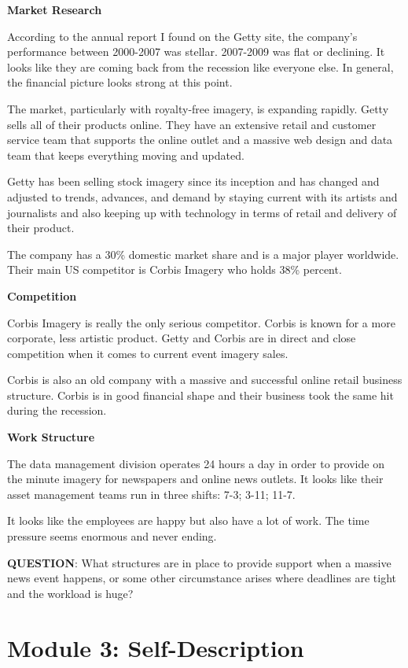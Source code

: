\textbf{Market Research}

According to the annual report I found on the Getty site, the company's performance between 2000-2007 was stellar. 2007-2009 was flat or declining. It looks like they are coming back from the recession like everyone else. In general, the financial picture looks strong at this point.
 
The market, particularly with royalty-free imagery, is expanding rapidly.
Getty sells all of their products online. They have an extensive retail and customer service team that supports the online outlet and a massive web design and data team that keeps everything moving and updated.

Getty has been selling stock imagery since its inception and has changed and adjusted to trends, advances, and demand by staying current with its artists and journalists and also keeping up with technology in terms of retail and delivery of their product.

The company has a 30\% domestic market share and is a major player worldwide. Their main US competitor is Corbis Imagery who holds 38\% percent.

\textbf{Competition}

Corbis Imagery is really the only serious competitor. Corbis is known for a more corporate, less artistic product. Getty and Corbis are in direct and close competition when it comes to current event imagery sales.

Corbis is also an old company with a massive and successful online retail business structure. Corbis is in good financial shape and their business took the same hit during the recession.

\textbf{Work Structure}

The data management division operates 24 hours a day in order to provide on the minute imagery for newspapers and online news outlets. It looks like their asset management teams run in three shifts: 7-3; 3-11; 11-7.

It looks like the employees are happy but also have a lot of work. The time pressure seems enormous and never ending.

\textbf{QUESTION}: What structures are in place to provide support when a massive news event happens, or some other circumstance arises where deadlines are tight and the workload is huge?
 
 
\pagebreak \section*{Module 3:	Self-Description}
\noindent\makebox[\textwidth]{\rule{\linewidth}{0.4pt}}  \localtableofcontents 
\noindent\makebox[\textwidth]{\rule{\linewidth}{0.4pt}} 


